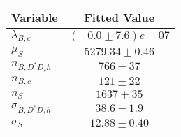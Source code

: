 \begin{tabular}[t]{lc}
\hline
Variable &Fitted Value\\
\hline\hline
$\lambda_{B,c}$&$(-0.0\pm7.6)e-07$\\
\hline
$\mu_S$&$5279.34\pm0.46$\\
\hline
$n_{B, D^* D_s h}$&$766\pm37$\\
\hline
$n_{B,c}$&$121\pm22$\\
\hline
$n_S$&$1637\pm35$\\
\hline
$\sigma_{B, D^* D_s h}$&$38.6\pm1.9$\\
\hline
$\sigma_S$&$12.88\pm0.40$\\
\hline
\end{tabular}